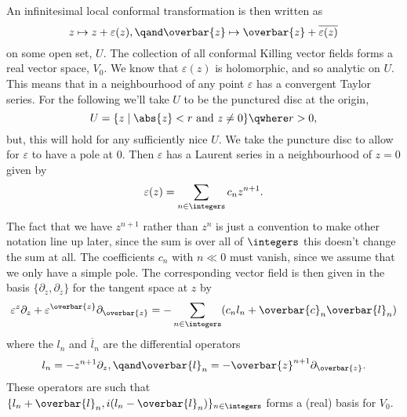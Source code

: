 \documentclass[fleqn]{NotesClass}
\begin{document}
    An infinitesimal local conformal transformation is then written as
    \begin{equation}
        z \mapsto z + \varepsilon(z), \qand \overbar{z} \mapsto \overbar{z} + \overline{\varepsilon(z)}
    \end{equation}
    on some open set, \(U\).
    The collection of all conformal Killing vector fields forms a real vector space, \(V_0\).
    We know that \(\varepsilon(z)\) is holomorphic, and so analytic on \(U\).
    This means that in a neighbourhood of any point \(\varepsilon\) has a convergent Taylor series.
    For the following we'll take \(U\) to be the punctured disc at the origin, 
    \begin{equation}
        U = \{z \mid \abs{z} < r \text{ and } z \ne 0\} \qwhere r > 0,
    \end{equation}
    but, this will hold for any sufficiently nice \(U\).
    We take the puncture disc to allow for \(\varepsilon\) to have a pole at 0.
    Then \(\varepsilon\) has a Laurent series in a neighbourhood of \(z = 0\) given by
    \begin{equation}
        \varepsilon(z) = \sum_{n \in \integers} c_n z^{n + 1}.
    \end{equation}
    The fact that we have \(z^{n + 1}\) rather than \(z^n\) is just a convention to make other notation line up later, since the sum is over all of \(\integers\) this doesn't change the sum at all.
    The coefficients \(c_n\) with \(n \ll 0\) must vanish, since we assume that we only have a simple pole.
    The corresponding vector field is then given in the basis \(\{\partial_z, \partial_{\overbar{z}}\}\) for the tangent space at \(z\) by
    \begin{equation}
        \varepsilon^z \partial_z + \varepsilon^{\overbar{z}} \partial_{\overbar{z}} = -\sum_{n \in \integers} (c_n l_n + \overbar{c}_n \overbar{l}_n)
    \end{equation}
    where the \(l_n\) and \(\overbar{l}_n\) are the differential operators
    \begin{equation}
        l_n = -z^{n + 1} \partial_z, \qand \overbar{l}_n = -\overbar{z}^{n + 1} \partial_{\overbar{z}}.
    \end{equation}
    These operators are such that \(\{l_n + \overbar{l}_n, i(l_n - \overbar{l}_n)\}_{n \in \integers}\) forms a (real) basis for \(V_0\).
    
\end{document}
